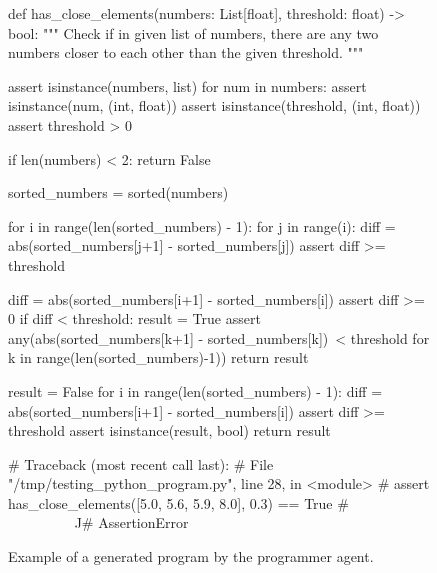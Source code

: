 \begin{figure*}[t]
\begin{python}
def has_close_elements(numbers: List[float], threshold: float) -> bool:
    """
    Check if in given list of numbers, there are any two numbers closer to each other than
    the given threshold.
    """

    assert isinstance(numbers, list)
    for num in numbers:
        assert isinstance(num, (int, float))
    assert isinstance(threshold, (int, float))
    assert threshold > 0

    if len(numbers) < 2:
        return False

    sorted_numbers = sorted(numbers)

    for i in range(len(sorted_numbers) - 1):
        for j in range(i):
            diff = abs(sorted_numbers[j+1] - sorted_numbers[j])
            assert diff >= threshold
        
        diff = abs(sorted_numbers[i+1] - sorted_numbers[i])
        assert diff >= 0
        if diff < threshold:
            result = True
            assert any(abs(sorted_numbers[k+1] - sorted_numbers[k])\
                < threshold for k in range(len(sorted_numbers)-1))
            return result

    result = False
    for i in range(len(sorted_numbers) - 1):
        diff = abs(sorted_numbers[i+1] - sorted_numbers[i])
        assert diff >= threshold
    assert isinstance(result, bool)
    return result

# Traceback (most recent call last):
#  File "/tmp/testing_python_program.py", line 28, in <module>
#    assert has_close_elements([5.0, 5.6, 5.9, 8.0], 0.3) == True
#           ^^^^^^^^^^^^^^^^^^^^^^^^^^^^^^^^^^^^^^^^^^^^^^^^^^^^^
# AssertionError
\end{python}
\caption{Example of a generated program by the programmer agent.}
\label{fig:program}
\end{figure*}